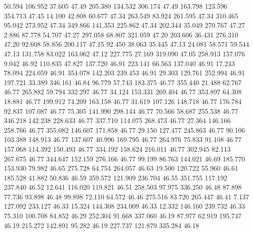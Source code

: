   50.594  106.952   37.605        47.49
 205.380  134.532  306.174        47.49
 163.798  123.596  354.713        47.45
  14.100   42.808   60.677        47.34
 263.549   83.924  261.595        47.34
 310.465   95.042  273.952        47.34
 349.866  141.353  225.862        47.34
 202.344   35.049  270.767        47.27
   2.886   87.778   54.707        47.27
 297.058   68.807  321.059        47.20
 203.606   36.431  276.310        47.20
  92.608   58.856  200.117        47.15
  92.450   38.063   35.445        47.13
  24.081   58.571   59.544        47.13
 131.758   83.022  163.062        47.12
 227.775   27.169  319.090        47.05
 258.913  157.076    9.042        46.92
 110.835   47.827  137.720        46.91
 223.141   66.563  137.040        46.91
  17.243   78.094  224.059        46.91
 354.078  142.203  239.453        46.91
  29.303  129.761  252.994        46.91
 197.721   33.389  346.161        46.84
  96.779   57.743  183.375        46.77
 355.440   21.488   62.767        46.77
 265.882   59.794  332.297        46.77
  34.124  153.331  269.404        46.77
 353.897   64.308   18.881        46.77
 199.912   74.209  163.158        46.77
  31.619  107.126  148.718        46.77
 176.784   92.837  107.087        46.77
  75.305  141.990  298.144        46.77
  70.566   58.687  255.538        46.77
 346.218  142.238  228.633        46.77
 337.710  114.075  268.473        46.77
  27.364  146.166  258.766        46.77
 355.082  146.607  171.858        46.77
  29.150  127.477  245.863        46.77
  90.106  103.388  148.913        46.77
 137.607   40.996  169.795        46.77
 264.976   75.833   91.108        46.77
 157.068  114.392  150.493        46.77
 334.192  158.624  216.011        46.77
 302.945   82.113  267.675        46.77
 344.647  152.159  276.166        46.77
  99.199   86.763  144.021        46.69
 185.770  153.930   79.982        46.65
 275.728   64.754  264.057        46.63
  19.500  120.722   55.960        46.61
 185.528   41.882   50.836        46.59
 359.572  121.909  236.704        46.55
 351.755  117.192  237.840        46.52
  12.641  116.020  119.821        46.51
 258.503   97.975  336.250        46.48
  87.898   77.736   93.898        46.48
  99.898   72.110   64.572        46.46
 275.516   83.720  265.447        46.41
   7.137  127.092  233.127        46.33
  15.324  144.308  234.009        46.33
  12.332  146.160  239.732        46.33
  75.310  100.708   84.852        46.29
 252.304   91.668  337.060        46.19
  87.977   62.919  195.747        46.19
 215.272  142.891   95.282        46.19
 227.737  121.879  335.284        46.18
